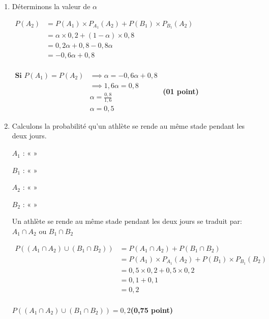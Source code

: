 \documentclass[12pt,a4paper]{article}
\begin{document}
\begin{enumerate}
\item Déterminons la valeur de $\alpha$

$
\begin{aligned}
P(A_2) &= P(A_1) \times P_{A_1}(A_2) + P(B_1) \times P_{B_1}(A_2)\\
			 &= \alpha \times 0,2 + (1-\alpha) \times 0,8\\
			 &= 0,2\alpha + 0,8-0,8\alpha\\
			 &= -0,6\alpha + 0,8\\
\end{aligned}
$

$
\begin{aligned}
\textbf{Si } P(A_1)=P(A_2) &\implies \alpha = -0,6\alpha + 0,8\\
													 &\implies 1,6\alpha = 0,8\\
													 &\alpha = \frac{0,8}{1,6}\\
													 &\alpha = 0,5
\end{aligned}
$
\hfill \textbf{(01 point)}
\item Calculons la probabilité qu’un athlète se rende au même stade pendant les deux jours.

$A_1$ :  « »

$B_1$ :  « »

$A_2$ :  « »

$B_2$ :  « »

Un athlète se rende au même stade pendant les deux jours se traduit par: $A_1\cap A_2$ ou $B_1\cap B_2$

$
\begin{aligned}
P((A_1\cap A_2) \cup (B_1\cap B_2)) &= P(A_1\cap A_2) + P(B_1\cap B_2)\\
																	  &=P(A_1) \times P_{A_1}(A_2) + P(B_1) \times P_{B_1}(B_2)\\
																	  &=0,5 \times 0,2 + 0,5 \times 0,2\\
																	  &=0,1 + 0,1\\
																	  &=0,2\\
\end{aligned}
$


\begin{center}
$\boxed{P((A_1\cap A_2) \cup (B_1\cap B_2))=0,2}$\hfill \textbf{(0,75 point)}
\end{center}


\end{enumerate}
\end{document}
